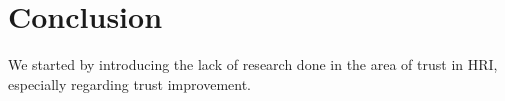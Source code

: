 \section{Conclusion}
\label{sec:Conclusion}
We started by introducing the lack of research done in the area of trust in \ac{HRI}, especially regarding trust improvement.